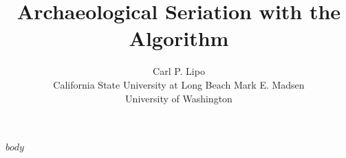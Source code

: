 \documentclass[article]{jss}
\author{Carl P. Lipo\\California State University at Long Beach \And 
        Mark E. Madsen\\University of Washington}
\title{Archaeological Seriation with the \pkg{IDSS} Algorithm}
\begin{document}
$body$
\end{document}
